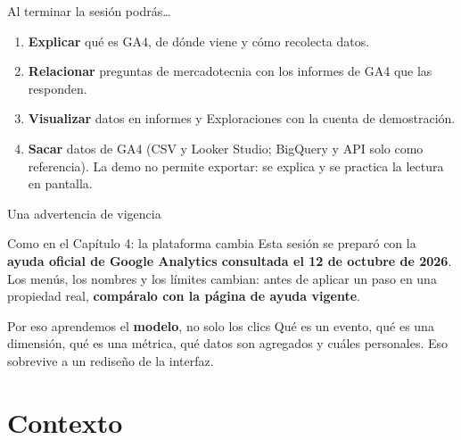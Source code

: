 \documentclass[aspectratio=169,xcolor=dvipsnames]{beamer}
\begin{document}
\begin{frame}{Al terminar la sesión podrás\ldots}
\begin{enumerate}
  \item \textbf{Explicar} qué es GA4, de dónde viene y cómo recolecta datos.
  \vspace{4pt}
  \item \textbf{Relacionar} preguntas de mercadotecnia con los informes de GA4 que las responden.
  \vspace{4pt}
  \item \textbf{Visualizar} datos en informes y Exploraciones con la cuenta de demostración.
  \vspace{4pt}
  \item \textbf{Sacar} datos de GA4 (CSV y Looker Studio; BigQuery y API solo como referencia). La demo no permite exportar: se explica y se practica la lectura en pantalla.
  \vspace{4pt}
\end{enumerate}
\end{frame}

\begin{frame}{Una advertencia de vigencia}
\begin{alertblock}{Como en el Capítulo 4: la plataforma cambia}
  Esta sesión se preparó con la \textbf{ayuda oficial de Google Analytics consultada el 12 de octubre de 2026}. Los menús, los nombres y los límites cambian: antes de aplicar un paso en una propiedad real, \textbf{compáralo con la página de ayuda vigente}.
\end{alertblock}
\begin{block}{Por eso aprendemos el \textbf{modelo}, no solo los clics}
  \small Qué es un evento, qué es una dimensión, qué es una métrica, qué datos son agregados y cuáles personales. Eso sobrevive a un rediseño de la interfaz.
\end{block}
\end{frame}

\section[Contexto]{Contexto}
\end{document}
